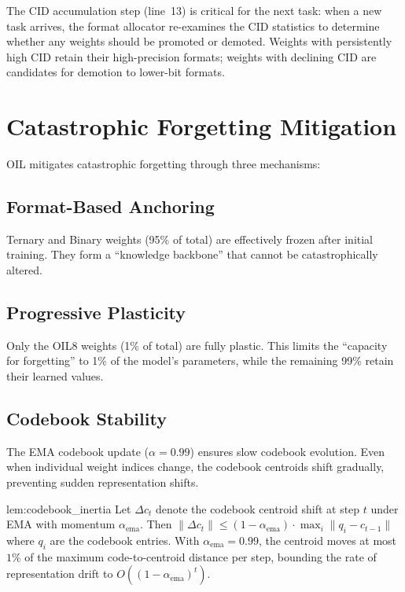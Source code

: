 The CID accumulation step (line~13) is critical for the next task: when a new task arrives, the format allocator re-examines the CID statistics to determine whether any weights should be promoted or demoted. Weights with persistently high CID retain their high-precision formats; weights with declining CID are candidates for demotion to lower-bit formats.

\section{Catastrophic Forgetting Mitigation}
\label{sec:forgetting_mitigation}

OIL mitigates catastrophic forgetting through three mechanisms:

\subsection{Format-Based Anchoring}

Ternary and Binary weights (95\% of total) are effectively frozen after initial training. They form a ``knowledge backbone'' that cannot be catastrophically altered.

\subsection{Progressive Plasticity}

Only the OIL8 weights (1\% of total) are fully plastic. This limits the ``capacity for forgetting'' to 1\% of the model's parameters, while the remaining 99\% retain their learned values.

\subsection{Codebook Stability}

The EMA codebook update ($\alpha = 0.99$) ensures slow codebook evolution. Even when individual weight indices change, the codebook centroids shift gradually, preventing sudden representation shifts.

\begin{mylemma}{lem:codebook_inertia}
Let $\Delta c_t$ denote the codebook centroid shift at step $t$ under EMA with momentum $\alpha_{\text{ema}}$. Then $\|\Delta c_t\| \leq (1 - \alpha_{\text{ema}}) \cdot \max_i \|q_i - c_{t-1}\|$ where $q_i$ are the codebook entries. With $\alpha_{\text{ema}} = 0.99$, the centroid moves at most $1\%$ of the maximum code-to-centroid distance per step, bounding the rate of representation drift to $O((1 - \alpha_{\text{ema}})^t)$.
\end{mylemma}

